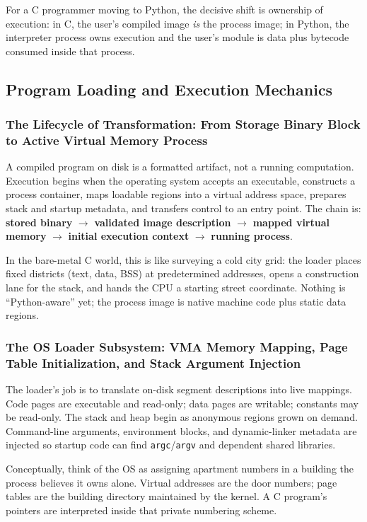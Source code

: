 \documentclass[a4paper,twoside]{report}
\begin{document}
For a C programmer moving to Python, the decisive shift is ownership of execution: in C, the user's compiled image \emph{is} the process image; in Python, the interpreter process owns execution and the user's module is data plus bytecode consumed inside that process.


\subsection{Program Loading and Execution Mechanics}

\subsubsection{The Lifecycle of Transformation: From Storage Binary Block to Active Virtual Memory Process}

A compiled program on disk is a formatted artifact, not a running computation. Execution begins when the operating system accepts an executable, constructs a process container, maps loadable regions into a virtual address space, prepares stack and startup metadata, and transfers control to an entry point. The chain is: \textbf{stored binary} $\rightarrow$ \textbf{validated image description} $\rightarrow$ \textbf{mapped virtual memory} $\rightarrow$ \textbf{initial execution context} $\rightarrow$ \textbf{running process}.

In the bare-metal C world, this is like surveying a cold city grid: the loader places fixed districts (text, data, BSS) at predetermined addresses, opens a construction lane for the stack, and hands the CPU a starting street coordinate. Nothing is ``Python-aware'' yet; the process image is native machine code plus static data regions.

\subsubsection{The OS Loader Subsystem: VMA Memory Mapping, Page Table Initialization, and Stack Argument Injection}

The loader's job is to translate on-disk segment descriptions into live mappings. Code pages are executable and read-only; data pages are writable; constants may be read-only. The stack and heap begin as anonymous regions grown on demand. Command-line arguments, environment blocks, and dynamic-linker metadata are injected so startup code can find \texttt{argc}/\texttt{argv} and dependent shared libraries.

Conceptually, think of the OS as assigning apartment numbers in a building the process believes it owns alone. Virtual addresses are the door numbers; page tables are the building directory maintained by the kernel. A C program's pointers are interpreted inside that private numbering scheme.
\end{document}
